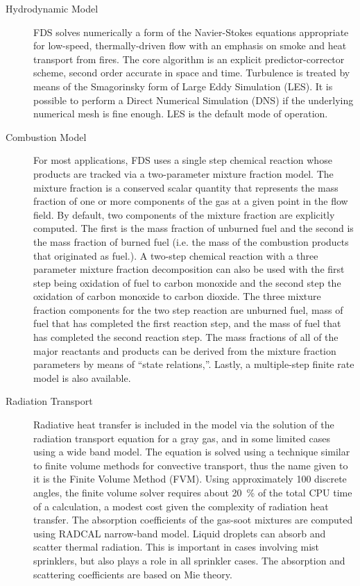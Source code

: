\documentclass[11pt]{book}
\begin{document}
\begin{description}
\item[Hydrodynamic Model]
FDS solves numerically a form of the Navier-Stokes equations appropriate
for low-speed, thermally-driven flow with an emphasis on
smoke and heat transport from fires. The core algorithm is an
explicit predictor-corrector scheme, second order accurate in space
and time. Turbulence is treated by means of the Smagorinsky form of
Large Eddy Simulation (LES). It is possible to perform a Direct
Numerical Simulation (DNS) if the underlying numerical mesh is fine
enough. LES is the default mode of operation.

\item[Combustion Model]
For most applications, FDS uses a single step chemical reaction whose products are tracked via
a two-parameter mixture fraction model.  The mixture fraction is a conserved
scalar quantity that represents the mass fraction of one or more components of the gas at
a given point in the flow field.  By default, two components of the mixture fraction are explicitly
computed. The first is the mass fraction of unburned fuel and
the second is the mass fraction of burned fuel (i.e. the mass of the combustion products
that originated as fuel.).  A two-step chemical reaction with a three parameter
mixture fraction decomposition can also be used with the first step being oxidation of fuel
to carbon monoxide and the second step the oxidation of carbon monoxide to carbon dioxide.
The three mixture fraction components for the two step reaction
are unburned fuel, mass of fuel that has completed the first reaction step, and the mass
of fuel that has completed the second reaction step.  The mass fractions of all of the major
reactants and products can be derived from the mixture fraction parameters by means of
``state relations,''.  Lastly, a multiple-step finite rate model is also available.

\item[Radiation Transport] Radiative heat transfer is included in the
model via the solution of the radiation transport equation for a
gray gas, and in some limited cases using a wide band
model.  The equation is solved using a technique similar to finite
volume methods for convective transport, thus the name given to it is
the Finite Volume Method (FVM).  Using approximately 100 discrete
angles, the finite volume solver requires about 20~\% of the total CPU
time of a calculation, a modest cost given the complexity of radiation
heat transfer. The absorption coefficients of the gas-soot mixtures
are computed using RADCAL narrow-band model.  Liquid droplets can
absorb and scatter thermal radiation. This is important in cases
involving mist sprinklers, but also plays a role in all sprinkler
cases.  The absorption and scattering coefficients are based on Mie
theory.


\end{description}
\end{document}
